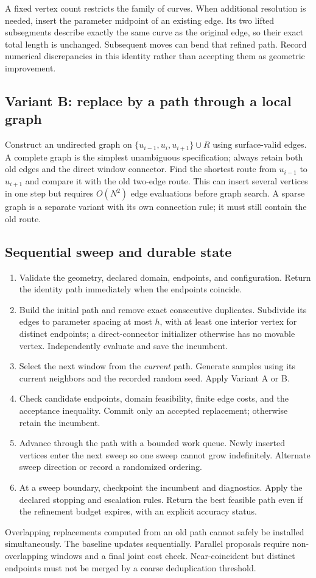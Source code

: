 \documentclass[11pt,letterpaper]{article}
\begin{document}
A fixed vertex count restricts the family of curves. When additional resolution is needed, insert the parameter midpoint of an existing edge. Its two lifted subsegments describe exactly the same curve as the original edge, so their exact total length is unchanged. Subsequent moves can bend that refined path. Record numerical discrepancies in this identity rather than accepting them as geometric improvement.

\subsection{Variant B: replace by a path through a local graph}
Construct an undirected graph on $\{u_{i-1},u_i,u_{i+1}\}\cup R$ using surface-valid edges. A complete graph is the simplest unambiguous specification; always retain both old edges and the direct window connector. Find the shortest route from $u_{i-1}$ to $u_{i+1}$ and compare it with the old two-edge route. This can insert several vertices in one step but requires $O(N^2)$ edge evaluations before graph search. A sparse graph is a separate variant with its own connection rule; it must still contain the old route.

\subsection{Sequential sweep and durable state}
\begin{enumerate}
\item Validate the geometry, declared domain, endpoints, and configuration. Return the identity path immediately when the endpoints coincide.
\item Build the initial path and remove exact consecutive duplicates. Subdivide its edges to parameter spacing at most $h$, with at least one interior vertex for distinct endpoints; a direct-connector initializer otherwise has no movable vertex. Independently evaluate and save the incumbent.
\item Select the next window from the \emph{current} path. Generate samples using its current neighbors and the recorded random seed. Apply Variant A or B.
\item Check candidate endpoints, domain feasibility, finite edge costs, and the acceptance inequality. Commit only an accepted replacement; otherwise retain the incumbent.
\item Advance through the path with a bounded work queue. Newly inserted vertices enter the next sweep so one sweep cannot grow indefinitely. Alternate sweep direction or record a randomized ordering.
\item At a sweep boundary, checkpoint the incumbent and diagnostics. Apply the declared stopping and escalation rules. Return the best feasible path even if the refinement budget expires, with an explicit accuracy status.
\end{enumerate}
Overlapping replacements computed from an old path cannot safely be installed simultaneously. The baseline updates sequentially. Parallel proposals require non-overlapping windows and a final joint cost check. Near-coincident but distinct endpoints must not be merged by a coarse deduplication threshold.
\end{document}
